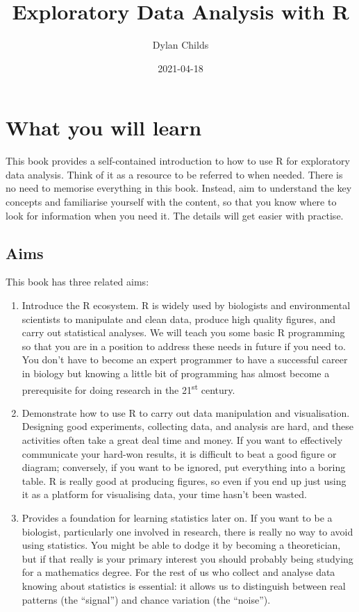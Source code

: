 \documentclass[
]{book}
\title{Exploratory Data Analysis with R}
\author{Dylan Childs}
\date{2021-04-18}
\begin{document}
\maketitle

{
\setcounter{tocdepth}{1}
\tableofcontents
}
\hypertarget{what-you-will-learn}{%
\chapter*{What you will learn}\label{what-you-will-learn}}

This book provides a self-contained introduction to how to use R for exploratory data analysis. Think of it as a resource to be referred to when needed. There is no need to memorise everything in this book. Instead, aim to understand the key concepts and familiarise yourself with the content, so that you know where to look for information when you need it. The details will get easier with practise.

\hypertarget{aims}{%
\section*{Aims}\label{aims}}

This book has three related aims:

\begin{enumerate}
\def\labelenumi{\arabic{enumi}.}
\item
  Introduce the R ecosystem. R is widely used by biologists and environmental scientists to manipulate and clean data, produce high quality figures, and carry out statistical analyses. We will teach you some basic R programming so that you are in a position to address these needs in future if you need to. You don't have to become an expert programmer to have a successful career in biology but knowing a little bit of programming has almost become a prerequisite for doing research in the 21\textsuperscript{st} century.
\item
  Demonstrate how to use R to carry out data manipulation and visualisation. Designing good experiments, collecting data, and analysis are hard, and these activities often take a great deal time and money. If you want to effectively communicate your hard-won results, it is difficult to beat a good figure or diagram; conversely, if you want to be ignored, put everything into a boring table. R is really good at producing figures, so even if you end up just using it as a platform for visualising data, your time hasn't been wasted.
\item
  Provides a foundation for learning statistics later on. If you want to be a biologist, particularly one involved in research, there is really no way to avoid using statistics. You might be able to dodge it by becoming a theoretician, but if that really is your primary interest you should probably being studying for a mathematics degree. For the rest of us who collect and analyse data knowing about statistics is essential: it allows us to distinguish between real patterns (the ``signal'') and chance variation (the ``noise'').
\end{enumerate}
\end{document}
